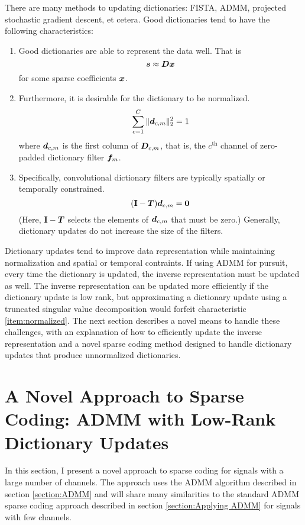 There are many methods to updating dictionaries: FISTA, ADMM, projected stochastic gradient descent, et cetera. Good dictionaries tend to have the following characteristics:
\begin{enumerate}
\item Good dictionaries are able to represent the data well. That is \label{item:improvement property}
\begin{equation}
\bm{s} \approx \bm{D}\bm{x}
\end{equation}
for some sparse coefficients $\bm{x}$.
\item Furthermore, it is desirable for the dictionary to be normalized.\label{item:normalized}
\begin{equation}
\sum_{c = 1}^C \|\bm{d}_{c,m}\|_2^2 = 1
\end{equation}
where $\bm{d}_{c,m}$ is the first column of $\bm{D}_{c,m}$, that is, the $c^{\text{th}}$ channel of zero-padded dictionary filter $\bm{f}_m$.
\item Specifically, convolutional dictionary filters are typically spatially or temporally constrained. \label{item:spatially constrained}
\begin{equation}
({\bf I} - \bm{T})\bm{d}_{c,m} = \bm{0}
\end{equation}
(Here, ${\bf I} - \bm{T}$ selects the elements of $\bm{d}_{c,m}$ that must be zero.) Generally, dictionary updates do not increase the size of the filters.
\end{enumerate}

Dictionary updates tend to improve data representation while maintaining normalization and spatial or temporal contraints.  If using ADMM for pursuit, every time the dictionary is updated, the inverse representation must be updated as well. The inverse representation can be updated more efficiently if the dictionary update is low rank, but approximating a dictionary update using a truncated singular value decomposition would forfeit characteristic \ref{item:normalized}. The next section describes a novel means to handle these challenges, with an explanation of how to efficiently update the inverse representation and a novel sparse coding method designed to handle dictionary updates that produce unnormalized dictionaries.

\section{A Novel Approach to Sparse Coding: ADMM with Low-Rank Dictionary Updates}
In this section, I present a novel approach to sparse coding for signals with a large number of channels. The approach uses the ADMM algorithm described in section \ref{section:ADMM} and will share many similarities to the standard ADMM sparse coding approach described in section \ref{section:Applying ADMM} for signals with few channels.

